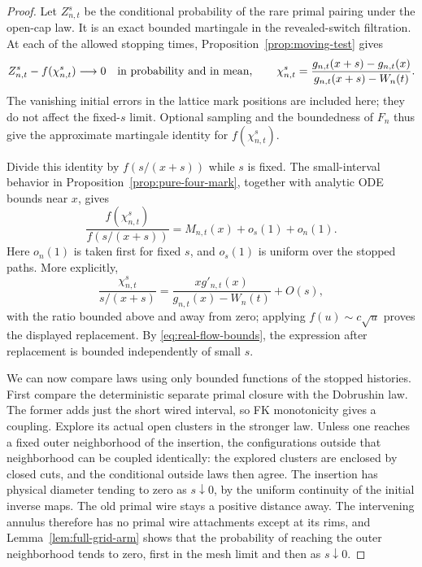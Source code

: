 \begin{proof}
Let $Z_{n,t}^{s}$ be the conditional probability of the rare primal
pairing under the open-cap law.  It is an exact bounded
martingale in the revealed-switch filtration.  At each of the
allowed stopping times,
Proposition~\ref{prop:moving-test} gives
\begin{equation}\label{eq:four-mark-replacement}
 Z_{n,t}^{s}-f(\chi_{n,t}^{s})\longrightarrow0
 \quad\hbox{in probability and in mean},\qquad
 \chi_{n,t}^{s}=
 \frac{g_{n,t}(x+s)-g_{n,t}(x)}
      {g_{n,t}(x+s)-W_n(t)}.
\end{equation}
The vanishing initial errors in the lattice mark positions are
included here; they do not affect the fixed-$s$ limit.
Optional sampling and the boundedness of $F_n$ thus give the
approximate martingale identity for $f(\chi_{n,t}^{s})$.

Divide this identity by $f(s/(x+s))$ while $s$ is fixed.  The
small-interval behavior in
Proposition~\ref{prop:pure-four-mark}, together with analytic ODE
bounds near $x$, gives
\begin{equation}\label{eq:normalized-small-interval}
 \frac{f(\chi_{n,t}^{s})}{f(s/(x+s))}
       =M_{n,t}(x)+o_s(1)+o_n(1).
\end{equation}
Here $o_n(1)$ is taken first for fixed $s$, and $o_s(1)$ is uniform
over the stopped paths.  More explicitly,
\[
 \frac{\chi_{n,t}^{s}}{s/(x+s)}
 =\frac{xg'_{n,t}(x)}{g_{n,t}(x)-W_n(t)}+O(s),
\]
with the ratio bounded above and away from zero; applying
$f(u)\sim c\sqrt u$ proves the displayed replacement.  By
\eqref{eq:real-flow-bounds}, the expression after replacement is
bounded independently of small $s$.

We can now compare laws using only bounded functions of the
stopped histories.  First compare the deterministic separate
primal closure with the Dobrushin law.  The former adds just the
short wired interval, so FK monotonicity gives a coupling.
Explore its actual open clusters in the stronger law.  Unless
one reaches a fixed outer neighborhood of the insertion, the
configurations outside that neighborhood can be coupled
identically: the explored clusters are enclosed by closed cuts,
and the conditional outside laws then agree.  The insertion has
physical diameter tending to zero as $s\downarrow0$, by the
uniform continuity of the initial inverse maps.  The old primal
wire stays a positive distance away.  The intervening annulus
therefore has no primal wire attachments except at its rims,
and Lemma~\ref{lem:full-grid-arm} shows that the probability of
reaching the outer neighborhood tends to zero, first in the mesh
limit and then as $s\downarrow0$.


\end{proof}
